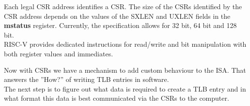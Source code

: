 Each legal CSR address identifies a CSR. The size of the CSRs identified by the CSR address depends
on the values of the SXLEN and UXLEN fields in the \textbf{mstatus} register. Currently, the
specification \cite{RISCVInstructionSet} allows for 32 bit, 64 bit and 128 bit.\\ 
RISC-V provides dedicated instructions for read/write and bit manipulation with both register values
and immediates.

Now with CSRs we have a mechanism to add custom behaviour to the ISA. That answers the ''How?''
of writing TLB entries in software.\\
The next step is to figure out what data is required to create a TLB entry and in what format
this data is best communicated via the CSRs to the computer.\\






